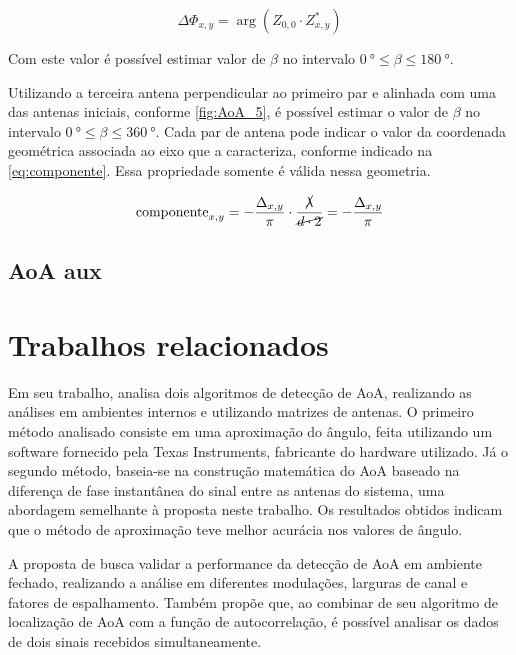 \begin{equation}\label{eq:phase}
    \Delta\Phi_{x,y} = \arg(Z_{0,0}\cdot Z^*_{x,y})
\end{equation}

Com este valor é possível estimar valor de $\beta$ no intervalo $\SI{0}{\degree} \leq \beta \leq \SI{180}{\degree}$.

Utilizando a terceira antena perpendicular ao primeiro par e alinhada com uma das antenas iniciais, conforme \autoref{fig:AoA_5}, é possível estimar o valor de $\beta$ no intervalo $\SI{0}{\degree} \leq \beta \leq \SI{360}{\degree}$.
Cada par de antena pode indicar o valor da coordenada geométrica associada ao eixo que a caracteriza, conforme indicado na \autoref{eq:componente}.
Essa propriedade somente é válida nessa geometria.

\begin{equation}\label{eq:componente}
    \text{componente}_{x,y} = -\frac{\Delta_{x,y}}{\pi}\cdot\frac{\cancel{\lambda}}{\cancel{d \cdot 2}} = -\frac{\Delta_{x,y}}{\pi}
\end{equation}

\subsection{AoA aux}




\section{Trabalhos relacionados}

Em seu trabalho, \citeauthor{horst2021localization} \cite{horst2021localization} analisa dois algoritmos de detecção de \ac{AoA}, realizando as análises em ambientes internos e utilizando matrizes de antenas.
O primeiro método analisado consiste em uma aproximação do ângulo, feita utilizando um software fornecido pela Texas Instruments, fabricante do hardware utilizado.
Já o segundo método, baseia-se na construção matemática do \ac{AoA} baseado na diferença de fase instantânea do sinal entre as antenas do sistema, uma abordagem semelhante à proposta neste trabalho.
Os resultados obtidos indicam que o método de aproximação teve melhor acurácia nos valores de ângulo.

A proposta de \citeauthor{zeaiter:hal-03693641} \cite{zeaiter:hal-03693641} busca validar a performance da detecção de \ac{AoA} em ambiente fechado, realizando a análise em diferentes modulações, larguras de canal e fatores de espalhamento.
Também propõe que, ao combinar de seu algoritmo de localização de \ac{AoA} com a função de autocorrelação, é possível analisar os dados de dois sinais recebidos simultaneamente.

